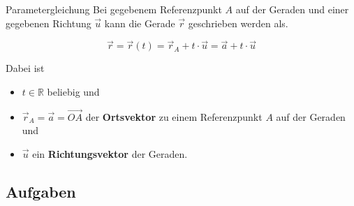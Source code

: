 \begin{definition}{Parametergleichung}{}
  Bei gegebenem Referenzpunkt $A$ auf der Geraden und einer gegebenen
  Richtung $\vec{u}$ kann die Gerade $\vec{r}$ geschrieben werden als.
  
  $$\vec{r} = \vec{r}(t) = \vec{r}_A + t\cdot{} \vec{u} = \vec{a} + t\cdot{}\vec{u}$$

  Dabei ist
  \begin{itemize}
    \item $t\in\mathbb{R}$ beliebig und
    \item $\vec{r}_A = \vec{a} = \overrightarrow{OA}$ der
      \textbf{Ortsvektor} zu einem Referenzpunkt $A$ auf der Geraden und
    \item $\vec{u}$ ein
      \textbf{Richtungsvektor} der Geraden.
  \end{itemize}
  
\end{definition}

\subsection*{Aufgaben}


\newpage%
